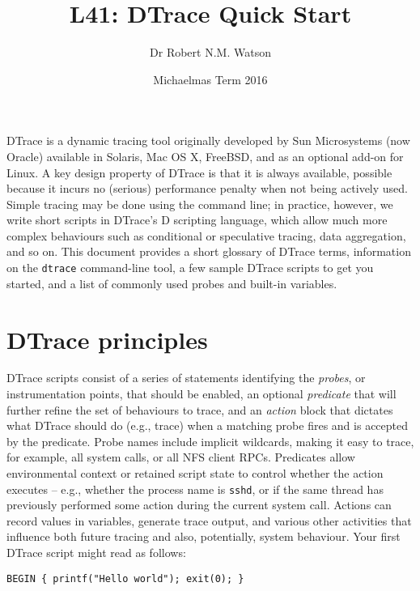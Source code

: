 \documentclass[a4paper,10pt]{article}
\begin{document}
\newcommand{\code}[1]{\texttt{\small #1}}

\title{L41: DTrace Quick Start}
\author{Dr Robert N.M. Watson}
\date{Michaelmas Term 2016}
\maketitle

DTrace is a dynamic tracing tool originally developed by Sun Microsystems (now
Oracle) available in Solaris, Mac OS X, FreeBSD, and as an optional add-on for
Linux.
A key design property of DTrace is that it is always available, possible
because it incurs no (serious) performance penalty when not being actively
used.
Simple tracing may be done using the command line; in practice, however, we
write short scripts in DTrace's D scripting language, which allow much more
complex behaviours such as conditional or speculative tracing, data
aggregation, and so on.
This document provides a short glossary of DTrace terms, information on the
\code{dtrace} command-line tool, a few sample DTrace scripts to get you
started, and a list of commonly used probes and built-in variables.

\section*{DTrace principles}

DTrace scripts consist of a series of statements identifying the
\textit{probes}, or instrumentation points, that should be enabled, an
optional \textit{predicate} that will further refine the set of behaviours to
trace, and an \textit{action} block that dictates what DTrace should do (e.g.,
trace) when a matching probe fires and is accepted by the predicate.
Probe names include implicit wildcards, making it easy to trace, for example,
all system calls, or all NFS client RPCs.
Predicates allow environmental context or retained script state to control
whether the action executes -- e.g., whether the process name is \code{sshd},
or if the same thread has previously performed some action during the current
system call.
Actions can record values in variables, generate trace output, and various
other activities that influence both future tracing and also, potentially,
system behaviour.
Your first DTrace script might read as follows:

\begin{small}
\begin{verbatim}
BEGIN { printf("Hello world"); exit(0); }
\end{verbatim}
\end{small}
\end{document}
